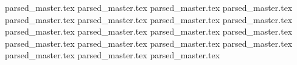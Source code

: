 \documentclass[a4paper]{article}
\begin{document}
{parsed_master.tex}	
{parsed_master.tex}	
{parsed_master.tex}	
{parsed_master.tex}	
{parsed_master.tex}	
{parsed_master.tex}	
{parsed_master.tex}	
{parsed_master.tex}	
{parsed_master.tex}	
{parsed_master.tex}	
{parsed_master.tex}	
{parsed_master.tex}	
{parsed_master.tex}	
{parsed_master.tex}	
{parsed_master.tex}	
{parsed_master.tex}	
{parsed_master.tex}	
{parsed_master.tex}	
{parsed_master.tex}	
\end{document}
